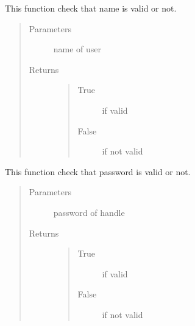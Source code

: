 \documentclass[letterpaper,10pt,english]{sphinxmanual}
\begin{document}

\begin{fulllineitems}
\label{\detokenize{janta:janta.viewhelper.is_name}}
This function check that name is valid or not.
\begin{quote}\begin{description}
\item[{Parameters}] \leavevmode
{} \textendash{} name of user

\item[{Returns}] \leavevmode
\begin{quote}\begin{description}
\item[{True}] \leavevmode
if valid

\item[{False}] \leavevmode
if not valid

\end{description}\end{quote}


\end{description}\end{quote}

\end{fulllineitems}


\begin{fulllineitems}
\label{\detokenize{janta:janta.viewhelper.is_password}}
This function check that password is valid or not.
\begin{quote}\begin{description}
\item[{Parameters}] \leavevmode
{} \textendash{} password of handle

\item[{Returns}] \leavevmode
\begin{quote}\begin{description}
\item[{True}] \leavevmode
if valid

\item[{False}] \leavevmode
if not valid

\end{description}\end{quote}


\end{description}\end{quote}

\end{fulllineitems}
\end{document}
